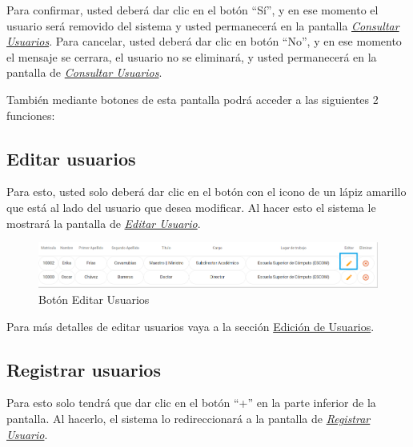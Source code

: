 \begin{enumerate}
\begin{figure}[!hbtp]
                \end{figure}
            
                Para confirmar, usted deberá dar clic en el botón “Sí”, y en ese momento el usuario será removido del sistema y usted permanecerá en la pantalla \hyperlink{consultarUs}{\textit{Consultar Usuarios}}.
                Para cancelar, usted deberá dar clic en botón “No”, y en ese momento el mensaje se cerrara, el usuario no se eliminará, y usted permanecerá en la pantalla de \hyperlink{consultarUs}{\textit{Consultar Usuarios}}.
        
        \end{enumerate}

        También mediante botones de esta pantalla podrá acceder a las siguientes 2 funciones:

        \subsection{Editar usuarios}

            Para esto, usted solo deberá dar clic en el botón con el icono de un lápiz amarillo que está al lado del usuario que desea modificar. Al hacer esto el sistema le mostrará la pantalla   de \hyperlink{editarUs}{\textit{Editar Usuario}}.
            
            \begin{figure}[!hbtp]
                \centering
                \hypertarget{editar}{\includegraphics[width=0.7\linewidth]{images/SP5/BtnEditar}}
                \caption{Botón Editar Usuarios}
                \label{editar}
            \end{figure}
            
            Para más detalles de editar usuarios vaya a la sección \hyperlink{editar-user}{Edición de Usuarios}.
        
        \subsection{Registrar  usuarios}

            Para esto solo tendrá que dar clic en el botón “+” en la parte inferior de la pantalla. Al hacerlo, el sistema  lo redireccionará a la pantalla de \hyperlink{registrarUs}{\textit{Registrar Usuario}}.
        
